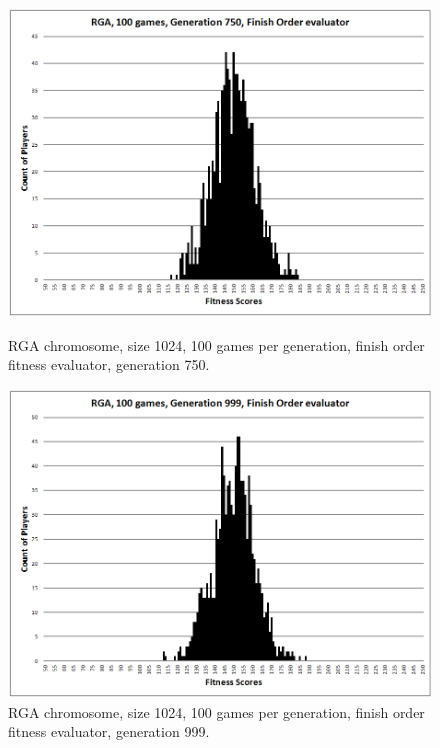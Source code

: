 \begin{figure}
\begin{minipage}[t]{0.47\linewidth}
\centering
\includegraphics[width=1.0\linewidth]{Figures/RGA_1024_G750_N100_FO.png}
\caption[RGA Fitness Distribution, 750th Generation]{RGA chromosome, size 1024,
100 games per generation, finish order fitness evaluator, generation
750.}
\label{figure-RGA-750th_gen_fitness}
\end{minipage}%
\hspace{0.06\linewidth}%
\begin{minipage}[t]{0.47\linewidth}
\centering
\includegraphics[width=1.0\linewidth]{Figures/RGA_1024_G999_N100_FO.png}
\caption[RGA Fitness Distribution, 999th Generation]{RGA chromosome, size 1024,
100 games per generation, finish order fitness evaluator, generation
999.}
\label{figure-RGA-999th_gen_fitness}
\end{minipage}
\end{figure}

